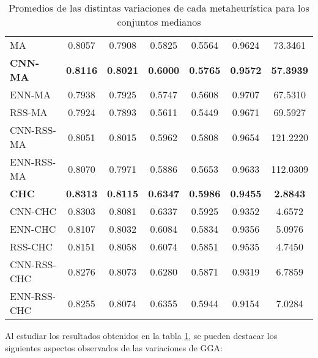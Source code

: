 \begin{table}[h!]
\begin{tabular}{l c c c c c c}
\hline

MA   & 0.8057 & 0.7908 & 0.5825 & 0.5564 & 0.9624 & 73.3461 \\
\textbf{CNN-MA} & \textbf{0.8116} & \textbf{0.8021} & \textbf{0.6000} & \textbf{0.5765} & \textbf{0.9572} & \textbf{57.3939} \\
ENN-MA & 0.7938 & 0.7925 & 0.5747 & 0.5608 & 0.9707 & 67.5310 \\
RSS-MA & 0.7924 & 0.7893 & 0.5611 & 0.5449 & 0.9671 & 69.5927 \\
CNN-RSS-MA & 0.8051 & 0.8015 & 0.5962 & 0.5808 & 0.9654 & 121.2220 \\
ENN-RSS-MA & 0.8070 & 0.7971 & 0.5886 & 0.5653 & 0.9633 & 112.0309 \\

\hline

\textbf{CHC} & \textbf{0.8313} & \textbf{0.8115} & \textbf{0.6347} & \textbf{0.5986} & \textbf{0.9455} & \textbf{2.8843} \\
CNN-CHC & 0.8303 & 0.8081 & 0.6337 & 0.5925 & 0.9352 & 4.6572 \\
ENN-CHC & 0.8107 & 0.8032 & 0.6084 & 0.5834 & 0.9356 & 5.0976 \\
RSS-CHC & 0.8151 & 0.8058 & 0.6074 & 0.5851 & 0.9535 & 4.7450 \\
CNN-RSS-CHC & 0.8276 & 0.8073 & 0.6280 & 0.5871 & 0.9319 & 6.7859 \\
ENN-RSS-CHC  & 0.8255 & 0.8074 & 0.6355 & 0.5944 & 0.9154 & 7.0284 \\


\hline
\end{tabular}
\caption{Promedios de las distintas variaciones de cada metaheurística para los conjuntos medianos}
\label{med-all}
\end{table}

Al estudiar los resultados obtenidos en la tabla \ref{med-all}, se pueden destacar los siguientes aspectos observados de las variaciones de GGA:


